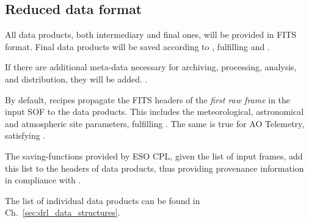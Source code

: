 %



\subsection{Reduced data format}
\label{ssec:reduced_data_format}

All data products, both intermediary and final ones, will be provided in FITS format. Final data products will be saved according to \cite{ESO-products_standard}, fulfilling  and .

If there are additional meta-data necessary for archiving, processing, analysis, and distribution, they will be added. .

By default, recipes propagate the FITS headers of the \emph{first raw frame} in
the input \ac{SOF} to the data products. This includes the meteorological,
astronomical and atmospheric site parameters, fulfilling . The same is true for \ac{AO} Telemetry, satisfying .

The saving-functions provided by ESO \ac{CPL}, given the list of input frames, add this list to the headers of data products, thus providing provenance information in compliance with .

The list of individual data products can be found in
Ch.~\ref{sec:drl_data_structures}.


